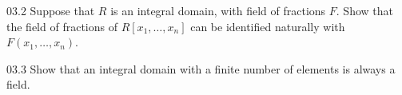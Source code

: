 \documentclass[11pt]{article}
\begin{document}
\begin{problem}{03.2}
  Suppose that $R$ is an integral domain, with field of fractions $F$. Show
  that the field of fractions of $R[x_{1},\ldots,x_{n}]$ can be identified
  naturally with $F(x_{1},\ldots,x_{n})$.
\end{problem}

\begin{problem}{03.3}
  Show that an integral domain with a finite number of elements is always a
  field.
\end{problem}
\end{document}

